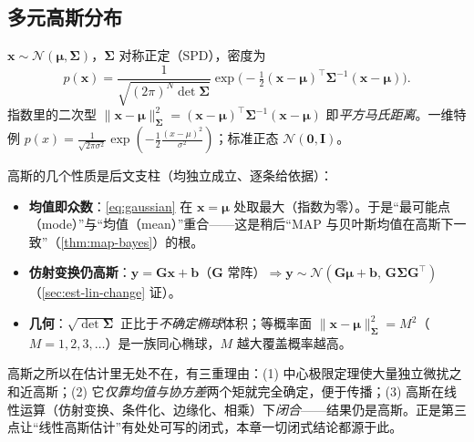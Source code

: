 \subsection{多元高斯分布}
\label{sec:est-gauss-def}

\begin{definition}[多元高斯分布]\label{def:gaussian}
$\mathbf{x}\sim\mathcal{N}(\boldsymbol{\mu},\boldsymbol{\Sigma})$，$\boldsymbol{\Sigma}$ 对称正定（SPD），密度为
\begin{equation}
  p(\mathbf{x})=\frac{1}{\sqrt{(2\pi)^{N}\det\boldsymbol{\Sigma}}}
  \exp\!\Big(-\tfrac12(\mathbf{x}-\boldsymbol{\mu})^\top\boldsymbol{\Sigma}^{-1}(\mathbf{x}-\boldsymbol{\mu})\Big).
  \label{eq:gaussian}
\end{equation}
指数里的二次型 $\|\mathbf{x}-\boldsymbol{\mu}\|_{\boldsymbol{\Sigma}}^2=(\mathbf{x}-\boldsymbol{\mu})^\top\boldsymbol{\Sigma}^{-1}(\mathbf{x}-\boldsymbol{\mu})$ 即\emph{平方马氏距离}。一维特例 $p(x)=\tfrac{1}{\sqrt{2\pi\sigma^2}}\exp(-\tfrac12\tfrac{(x-\mu)^2}{\sigma^2})$；标准正态 $\mathcal{N}(\mathbf{0},\mathbf{I})$。
\end{definition}

\noindent 高斯的几个性质是后文支柱（均独立成立、逐条给依据）：
\begin{itemize}
  \item \textbf{均值即众数}：\cref{eq:gaussian} 在 $\mathbf{x}=\boldsymbol{\mu}$ 处取最大（指数为零）。于是“最可能点（mode）”与“均值（mean）”重合——这是稍后“MAP 与贝叶斯均值在高斯下一致”（\cref{thm:map-bayes}）的根。
  \item \textbf{仿射变换仍高斯}：$\mathbf{y}=\mathbf{G}\mathbf{x}+\mathbf{b}$（$\mathbf{G}$ 常阵）$\Rightarrow\mathbf{y}\sim\mathcal{N}(\mathbf{G}\boldsymbol{\mu}+\mathbf{b},\,\mathbf{G}\boldsymbol{\Sigma}\mathbf{G}^\top)$（\cref{sec:est-lin-change} 证）。
  \item \textbf{几何}：$\sqrt{\det\boldsymbol{\Sigma}}$ 正比于\emph{不确定椭球}体积；等概率面 $\|\mathbf{x}-\boldsymbol{\mu}\|_{\boldsymbol{\Sigma}}^2=M^2$（$M=1,2,3,\dots$）是一族同心椭球，$M$ 越大覆盖概率越高。
\end{itemize}

\begin{insight}
高斯之所以在估计里无处不在，有三重理由：(1) 中心极限定理使大量独立微扰之和近高斯；(2) 它\emph{仅靠均值与协方差}两个矩就完全确定，便于传播；(3) 高斯在线性运算（仿射变换、条件化、边缘化、相乘）下\emph{闭合}——结果仍是高斯。正是第三点让“线性高斯估计”有处处可写的闭式，本章一切闭式结论都源于此。
\end{insight}

